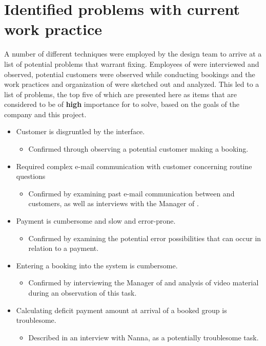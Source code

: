 \section{Identified problems with current work practice}
A number of different techniques were employed by the design team to arrive at a
list of potential problems that warrant fixing. Employees of \gomonkey{} were
interviewed and observed, potential customers were observed while conducting
bookings and the work practices and organization of \gomonkey{} were sketched out
and analyzed. This led to a list of problems, the top five of which are
presented here as items that are considered to be of \textbf{high} importance
for \gomonkey{} to solve, based on the goals of the company and this project.

\begin{itemize}
	\item Customer is disgruntled by the interface.
    \begin{itemize}
        \item Confirmed through observing a potential customer making a booking.
    \end{itemize}
	\item Required complex e-mail communication with customer concerning routine questions
        \begin{itemize}
            \item Confirmed by examining past e-mail communication between
                \gomonkey{} and customers, as well as interviews with the
                Manager of \gomonkey{}.
        \end{itemize}
	\item Payment is cumbersome and slow and error-prone.
        \begin{itemize}
            \item Confirmed by examining the potential error possibilities that
                can occur in relation to a payment.
        \end{itemize}
	\item Entering a booking into the system is cumbersome.
        \begin{itemize}
            \item Confirmed by interviewing the Manager of \gomonkey{} and
                analysis of video material during an observation of this task.
        \end{itemize}
	\item Calculating deficit payment amount at arrival of a booked group is
        troublesome.
        \begin{itemize}
            \item Described in an interview with Nanna, as a potentially
                troublesome task.
        \end{itemize}
\end{itemize}

